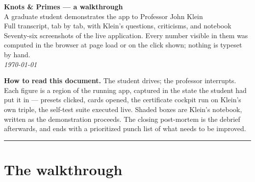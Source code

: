 
\thispagestyle{empty}
\begin{center}
{\LARGE\bfseries Knots \& Primes --- a walkthrough}\\[6pt]
{\large A graduate student demonstrates the app to Professor John Klein}\\[14pt]
{\normalsize Full transcript, tab by tab, with Klein's questions, criticisms, and notebook}\\[4pt]
{\footnotesize Seventy-six screenshots of the live application. Every number visible in them was
computed in the browser at page load or on the click shown; nothing is typeset by hand.}\\[10pt]
{\footnotesize\itshape \today}
\end{center}
\vspace{10pt}
\begin{snugshade}\small
\textbf{How to read this document.} The student drives; the professor interrupts. Each figure is a
region of the running app, captured in the state the student had put it in --- presets clicked, cards
opened, the certificate cockpit run on Klein's own triple, the self-test suite executed live. Shaded
boxes are Klein's notebook, written as the demonstration proceeds. The closing post-mortem is the
debrief afterwards, and ends with a prioritized punch list of what needs to be improved.
\end{snugshade}
\vspace{6pt}
\hrule
\vspace{12pt}

\section*{The walkthrough}
